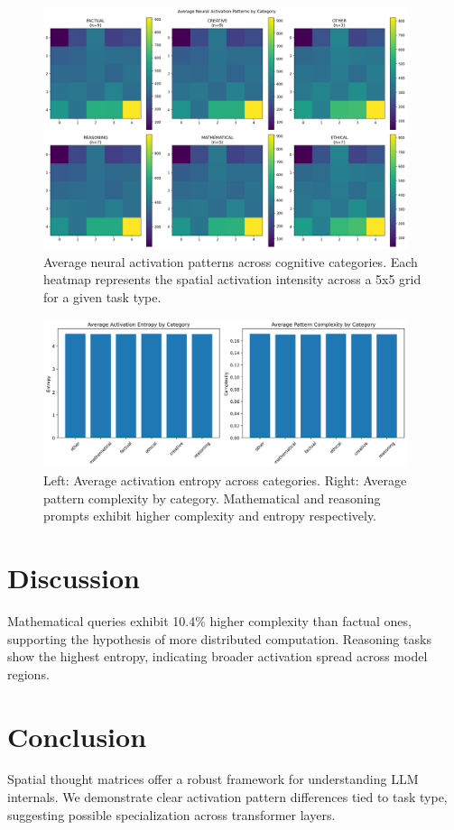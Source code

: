 \documentclass{article}
\begin{document}
\begin{figure}[H]
\centering
\includegraphics[width=0.95\textwidth]{category_heatmaps.png}
\caption{Average neural activation patterns across cognitive categories. Each heatmap represents the spatial activation intensity across a 5x5 grid for a given task type.}
\end{figure}

\begin{figure}[H]
\centering
\includegraphics[width=0.95\textwidth]{metrics_comparison.png}
\caption{Left: Average activation entropy across categories. Right: Average pattern complexity by category. Mathematical and reasoning prompts exhibit higher complexity and entropy respectively.}
\end{figure}

\section{Discussion}
Mathematical queries exhibit 10.4\% higher complexity than factual ones, supporting the hypothesis of more distributed computation. Reasoning tasks show the highest entropy, indicating broader activation spread across model regions.

\section{Conclusion}
Spatial thought matrices offer a robust framework for understanding LLM internals. We demonstrate clear activation pattern differences tied to task type, suggesting possible specialization across transformer layers.
\end{document}
